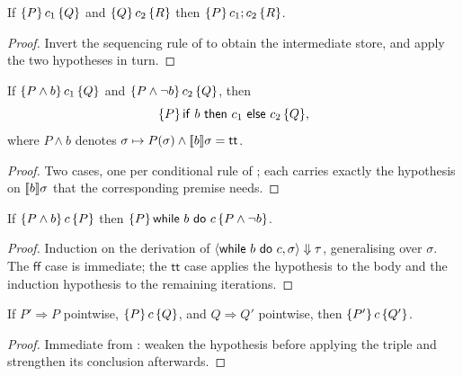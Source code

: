 \begin{lemma}
\label{lem:hoare-seq}
If $\{P\}\, c_1 \,\{Q\}$ and $\{Q\}\, c_2 \,\{R\}$ then $\{P\}\, c_1;c_2 \,\{R\}$.
\end{lemma}

\begin{proof}
Invert the sequencing rule of  to obtain the intermediate
store, and apply the two hypotheses in turn.
\end{proof}

\begin{lemma}
\label{lem:hoare-if}
If $\{P \wedge b\}\, c_1 \,\{Q\}$ and $\{P \wedge \lnot b\}\, c_2 \,\{Q\}$, then
\[
  \triple{P}{\ifk\ b\ \thenk\ c_1\ \elsek\ c_2}{Q} ,
\]
where $P \wedge b$ denotes $\sigma \mapsto P(\sigma) \wedge [\![b]\!]\sigma =
\mathsf{tt}$.
\end{lemma}

\begin{proof}
Two cases, one per conditional rule of ; each carries exactly
the hypothesis on $[\![b]\!]\sigma$ that the corresponding premise needs.
\end{proof}

\begin{lemma}
\label{lem:hoare-while}
If $\{P \wedge b\}\, c \,\{P\}$ then
$\{P\}\, \mathsf{while}\ b\ \mathsf{do}\ c \,\{P \wedge \lnot b\}$.
\end{lemma}

\begin{proof}
Induction on the derivation of $\bigstep{\whilek\ b\ \dok\ c}{\sigma}{\tau}$,
generalising over $\sigma$. The $\mathsf{ff}$ case is immediate; the
$\mathsf{tt}$ case applies the hypothesis to the body and the induction
hypothesis to the remaining iterations.
\end{proof}

\begin{proposition}
\label{prop:hoare-conseq}
If $P' \Rightarrow P$ pointwise, $\{P\}\, c \,\{Q\}$, and $Q \Rightarrow Q'$
pointwise, then $\{P'\}\, c \,\{Q'\}$.
\end{proposition}

\begin{proof}
Immediate from : weaken the hypothesis before applying the
triple and strengthen its conclusion afterwards.
\end{proof}
